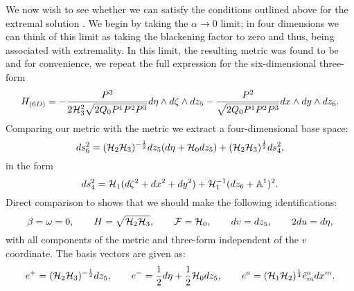 We now wish to see whether we can satisfy the conditions outlined above for the extremal solution . We begin by taking the $\alpha \rightarrow 0$ limit; in four dimensions we can think of this limit as taking the blackening factor to zero and thus, being associated with extremality. In this limit, the resulting metric was found to be  and for convenience, we repeat the full expression for the six-dimensional three-form
\begin{equation}
\begin{aligned}
        H_{(6D)} = -\frac{P^3}{2{\cal H}_3^2 \sqrt{2 Q_0 P^1 P^2 P^3}} d\eta \wedge d\zeta \wedge dz_5 - \frac{P^2}{\sqrt{2 Q_0 P^1 P^2 P^3}} dx \wedge dy \wedge dz_6.
\end{aligned}
\label{threeform6}
\end{equation}
Comparing our metric with the metric  we extract a four-dimensional base space:
\begin{equation}
    ds^2_6 = ({\cal H}_2 {\cal H}_3)^{-\frac{1}{2}} dz_5 (d\eta + {\cal H}_0 dz_5) + ({\cal H}_2 {\cal H}_3)^{\frac{1}{2}} ds_4^2 ,
\end{equation}
in the form
\begin{equation}
\label{eq:4dbase}
    ds^2_4 = {\cal H}_1 ( d\zeta^2 + dx^2 + dy^2) + {\cal H}_1^{-1} (dz_6 + \mathbb{A}^1)^2 .
\end{equation}
Direct comparison to  shows that we should make the following identifications:
\begin{equation*}
 \beta = \omega = 0, \qquad H = \sqrt{{\cal H}_2 {\cal H}_3}, \qquad \mathcal{F} = {\cal H}_0, \qquad dv = dz_5, \qquad 2du = d\eta    ,
\end{equation*}
with all components of the metric and three-form independent of the $v$ coordinate. The basis vectors are given as:
\begin{equation*}
    \begin{aligned}
        e^+ = ({\cal H}_2 {\cal H}_3)^{-\frac{1}{2}} dz_5, \qquad e^- = \frac{1}{2} d\eta + \frac{1}{2} {\cal H}_0 dz_5, \qquad e^a = ({\cal H}_1 {\cal H}_2)^{\frac{1}{4}}\tilde{e}^a_m dx^m .
    \end{aligned}
\end{equation*}


